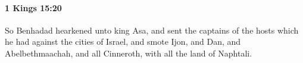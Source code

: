 
		\paragraph{1 Kings 15:20} %
			\label{1KINGS-15-20}

			So Benhadad hearkened unto king Asa, and sent the captains of the hosts which he had against the cities of Israel, and smote Ijon, and Dan, and Abelbethmaachah, and all Cinneroth, with all the land of Naphtali.


